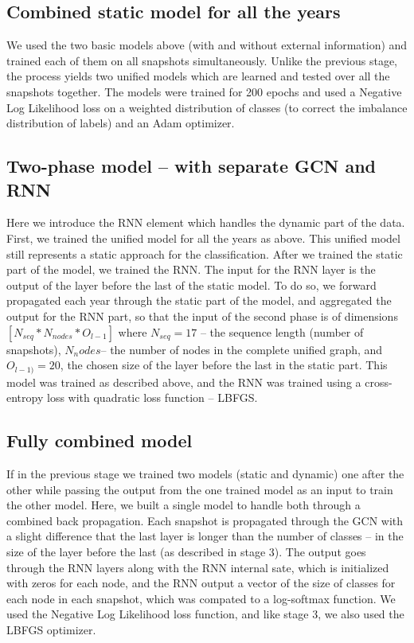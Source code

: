 
\subsection{Combined static model for all the years}
We used the two basic models above (with and without external information) and trained each of them on all snapshots simultaneously. Unlike the previous stage, the process yields two  unified models which are learned and tested over all the snapshots together. The models were trained for 200 epochs and used a Negative Log Likelihood loss on a weighted distribution of classes (to correct the imbalance distribution of labels) and an Adam optimizer.
\subsection{ Two-phase model – with separate GCN and RNN}
Here we introduce the RNN element which handles the dynamic part of the data.
First, we trained the unified model for all the years as above.  This unified model still represents a static approach for the classification. After we trained the static part of the model, we trained the RNN. The input for the RNN layer is the output of the layer before the last of the static model.  To do so, we forward propagated each year through the static part of the model, and aggregated the output for the RNN part, so that the input of the second phase is of dimensions $[N_{seq} * N_{nodes} * O_{l-1}]$ where $N_{seq}=17$ – the sequence length (number of snapshots), $N_nodes$– the number of nodes in the complete unified graph, and $O_{l-1)}=20$, the chosen size of the layer before the last in the static part.
This model was trained as described above, and the RNN was trained using a cross-entropy loss with quadratic loss function – LBFGS.
\subsection{Fully combined model}
If in the previous stage we trained two models (static and dynamic) one after the other while passing the output from the one trained model as an input to train the other model. Here, we built a single model to handle both through a combined back propagation. Each snapshot is propagated through the GCN with a slight difference that the last layer is longer than the number of classes – in the size of the layer before the last (as described in stage 3). The output goes through the RNN layers along with the RNN internal sate, which is initialized with zeros for each node, and the RNN output a vector of the size of classes for each node in each snapshot, which was compated  to  a log-softmax function. We used the Negative Log Likelihood loss function, and like stage 3, we also used the LBFGS optimizer. 
